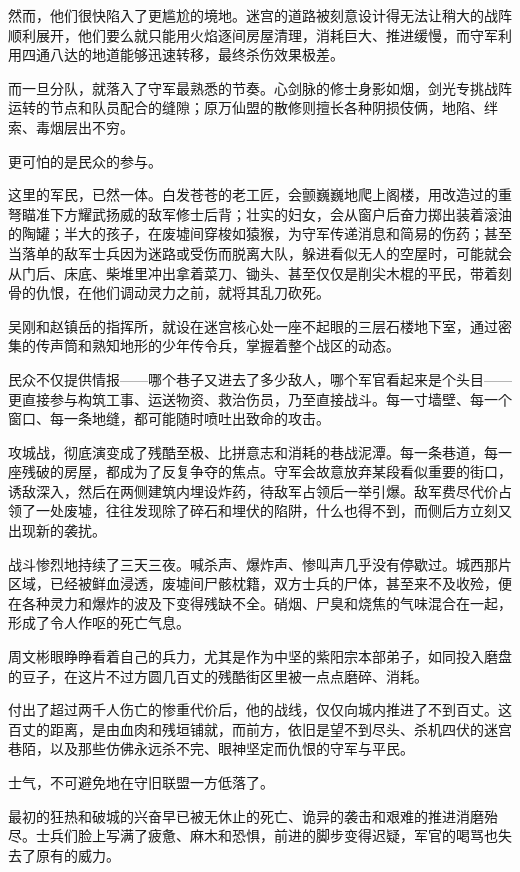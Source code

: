 然而，他们很快陷入了更尴尬的境地。迷宫的道路被刻意设计得无法让稍大的战阵顺利展开，他们要么就只能用火焰逐间房屋清理，消耗巨大、推进缓慢，而守军利用四通八达的地道能够迅速转移，最终杀伤效果极差。

而一旦分队，就落入了守军最熟悉的节奏。心剑脉的修士身影如烟，剑光专挑战阵运转的节点和队员配合的缝隙；原万仙盟的散修则擅长各种阴损伎俩，地陷、绊索、毒烟层出不穷。

更可怕的是民众的参与。

这里的军民，已然一体。白发苍苍的老工匠，会颤巍巍地爬上阁楼，用改造过的重弩瞄准下方耀武扬威的敌军修士后背；壮实的妇女，会从窗户后奋力掷出装着滚油的陶罐；半大的孩子，在废墟间穿梭如猿猴，为守军传递消息和简易的伤药；甚至当落单的敌军士兵因为迷路或受伤而脱离大队，躲进看似无人的空屋时，可能就会从门后、床底、柴堆里冲出拿着菜刀、锄头、甚至仅仅是削尖木棍的平民，带着刻骨的仇恨，在他们调动灵力之前，就将其乱刀砍死。

吴刚和赵镇岳的指挥所，就设在迷宫核心处一座不起眼的三层石楼地下室，通过密集的传声筒和熟知地形的少年传令兵，掌握着整个战区的动态。

民众不仅提供情报——哪个巷子又进去了多少敌人，哪个军官看起来是个头目——更直接参与构筑工事、运送物资、救治伤员，乃至直接战斗。每一寸墙壁、每一个窗口、每一条地缝，都可能随时喷吐出致命的攻击。

攻城战，彻底演变成了残酷至极、比拼意志和消耗的巷战泥潭。每一条巷道，每一座残破的房屋，都成为了反复争夺的焦点。守军会故意放弃某段看似重要的街口，诱敌深入，然后在两侧建筑内埋设炸药，待敌军占领后一举引爆。敌军费尽代价占领了一处废墟，往往发现除了碎石和埋伏的陷阱，什么也得不到，而侧后方立刻又出现新的袭扰。

战斗惨烈地持续了三天三夜。喊杀声、爆炸声、惨叫声几乎没有停歇过。城西那片区域，已经被鲜血浸透，废墟间尸骸枕籍，双方士兵的尸体，甚至来不及收殓，便在各种灵力和爆炸的波及下变得残缺不全。硝烟、尸臭和烧焦的气味混合在一起，形成了令人作呕的死亡气息。

周文彬眼睁睁看着自己的兵力，尤其是作为中坚的紫阳宗本部弟子，如同投入磨盘的豆子，在这片不过方圆几百丈的残酷街区里被一点点磨碎、消耗。

付出了超过两千人伤亡的惨重代价后，他的战线，仅仅向城内推进了不到百丈。这百丈的距离，是由血肉和残垣铺就，而前方，依旧是望不到尽头、杀机四伏的迷宫巷陌，以及那些仿佛永远杀不完、眼神坚定而仇恨的守军与平民。

士气，不可避免地在守旧联盟一方低落了。

最初的狂热和破城的兴奋早已被无休止的死亡、诡异的袭击和艰难的推进消磨殆尽。士兵们脸上写满了疲惫、麻木和恐惧，前进的脚步变得迟疑，军官的喝骂也失去了原有的威力。

